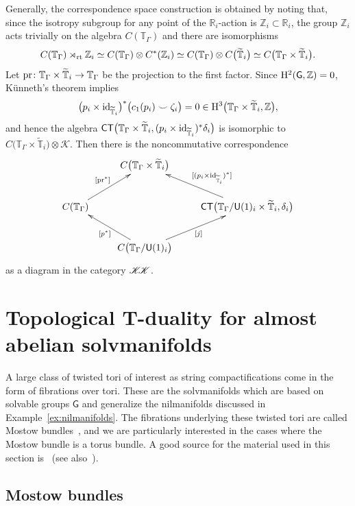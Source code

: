 \documentclass[pdftex]{sigma}
\numberwithin{equation}{section}
\newcommand{\C}{\complex}
\def\Id{{\rm id}}
\def\T{{\sf T}}
\def\C{{\sf C}}
\newcommand{\CCK}{\mathscr{K}}
\newcommand{\CK}{\mathcal{K}}
\newcommand{\sfG}{\mathsf{G}}
\newcommand{\sfU}{\mathsf{U}}
\newcommand{\rt}{{\rm rt}}
\newcommand{\complex}{{\mathbb C}} %
\newcommand{\zed}{{\mathbb Z}} %
\newcommand{\real}{{\mathbb R}} %
\newcommand{\torus}{{\mathbb T}} %
\begin{document}
Generally, the correspondence space construction is obtained by noting
that, since the iso\-tro\-py subgroup
for any point of the $\real_i$-action is $\zed_i\subset\real_i$, the group $\zed_i$
acts trivially on the algebra $C(\torus_\Gamma)$ and there are isomorphisms
\[
C(\torus_\Gamma)\rtimes_\rt\zed_i \simeq C(\torus_\Gamma)\otimes
C^*(\zed_i) \simeq C(\torus_\Gamma)\otimes C\big(\widetilde\torus_i\big)
\simeq C\big(\torus_\Gamma\times\widetilde\torus_i\big) .
\]
Let ${\rm pr}\colon \torus_\Gamma\times\widetilde\torus_i\to\torus_\Gamma$
be the projection to the first factor. Since ${\rm H}^2(\sfG,\zed)=0$,
K\"unneth's theorem implies
\[
\big(p_i\times\Id_{\widetilde\torus_i}\big)^*\big(c_1(p_i)\smile\zeta_i\big)=0 \in {\rm
 H}^3\big(\torus_\Gamma\times\widetilde\torus_i,\zed\big) ,
\]
and hence the algebra
$\C\T\big(\torus_\Gamma\times\widetilde\torus_i,(p_i\times\Id_{\widetilde\torus_i})^*\delta_i\big)$
is isomorphic to
$C\big(\torus_\Gamma\times\widetilde\torus_i\big)\otimes\CK$. Then there is the noncommutative correspondence
\[
\xymatrix{
 & C\big(\torus_\Gamma\times\widetilde\torus_i\big) & \\
C(\torus_\Gamma) \ar[ur]^{ \! \! \! \! [{\rm pr}^*]} & &
\C\T\big(\torus_\Gamma/\sfU(1)_i\times\widetilde\torus_i,\delta_i\big)
\ar[ul]_{ \ \ \
 [(p_i\times\Id_{\widetilde\torus_i})^*]} \\
 & C\big(\torus_\Gamma/\sfU(1)_i\big) \ar[ur]_{[j]}
 \ar[ul]^{[p^*]} &
}
\]
as a diagram in the category $\CCK\hspace{-1mm}\CCK$.

\section{Topological T-duality for almost abelian solvmanifolds}\label{sec:TdualityMostow}

A large class of twisted tori of interest as string compactifications
come in the form of fibrations over tori. These are the solvmanifolds
which are based on solvable groups $\sfG$ and generalize the
nilmanifolds discussed in Example~\ref{ex:nilmanifolds}. The fibrations
underlying these twisted tori are called {Mostow
 bundles}~\cite{Mostow1954}, and we are particularly interested in
the cases where the Mostow bundle is a torus bundle. A good source for
the material used in this section is~\cite{Bock2009} (see also~\cite{Console2016, OpreaTralle}).

\subsection{Mostow bundles}
\end{document}
